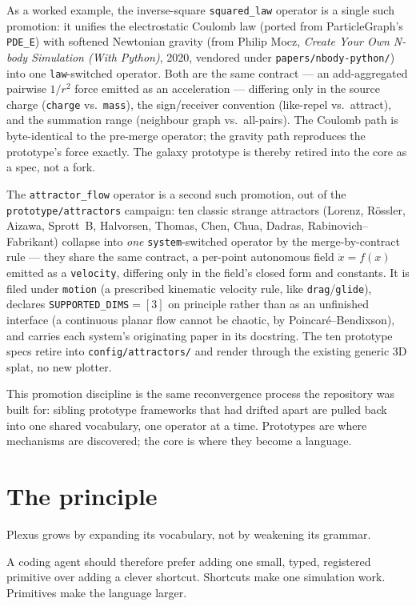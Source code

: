 \documentclass[11pt]{article}
\newcommand{\code}[1]{\texttt{#1}}
\begin{document}
As a worked example, the inverse-square \code{squared\_law} operator is a single such
promotion: it unifies the electrostatic Coulomb law (ported from ParticleGraph's
\code{PDE\_E}) with softened Newtonian gravity (from Philip Mocz, \emph{Create Your
Own N-body Simulation (With Python)}, 2020, vendored under \code{papers/nbody-python/})
into one \code{law}-switched operator. Both are the same contract --- an
add-aggregated pairwise $1/r^2$ force emitted as an acceleration --- differing only in
the source charge (\code{charge} vs.\ \code{mass}), the sign/receiver convention
(like-repel vs.\ attract), and the summation range (neighbour graph vs.\ all-pairs).
The Coulomb path is byte-identical to the pre-merge operator; the gravity path
reproduces the prototype's force exactly. The galaxy prototype is thereby retired into
the core as a spec, not a fork.

The \code{attractor\_flow} operator is a second such promotion, out of the
\code{prototype/attractors} campaign: ten classic strange attractors (Lorenz, R\"ossler,
Aizawa, Sprott~B, Halvorsen, Thomas, Chen, Chua, Dadras, Rabinovich--Fabrikant) collapse
into \emph{one} \code{system}-switched operator by the merge-by-contract rule --- they share
the same contract, a per-point autonomous field $\dot x=f(x)$ emitted as a \code{velocity},
differing only in the field's closed form and constants. It is filed under \code{motion}
(a prescribed kinematic velocity rule, like \code{drag}/\code{glide}), declares
\code{SUPPORTED\_DIMS}$=[3]$ on principle rather than as an unfinished interface (a
continuous planar flow cannot be chaotic, by Poincar\'e--Bendixson), and carries each
system's originating paper in its docstring. The ten prototype specs retire into
\code{config/attractors/} and render through the existing generic 3D splat, no new plotter.

This promotion discipline is the same reconvergence process the repository was built
for: sibling prototype frameworks that had drifted apart are pulled back into one
shared vocabulary, one operator at a time. Prototypes are where mechanisms are
discovered; the core is where they become a language.

\section{The principle}

Plexus grows by expanding its vocabulary, not by weakening its grammar.

A coding agent should therefore prefer adding one small, typed, registered primitive
over adding a clever shortcut. Shortcuts make one simulation work. Primitives make
the language larger.
\end{document}
